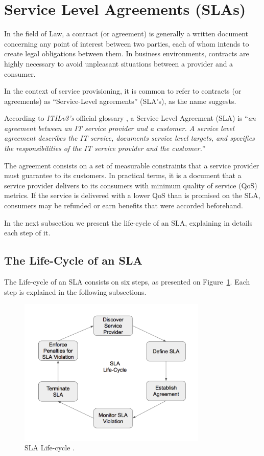 \section{Service Level Agreements (SLAs)}

In the field of Law, a contract (or agreement) is generally a written document concerning any point of interest between two parties, each of whom intends to create legal obligations between them. In business environments, contracts are highly necessary to avoid unpleasant situations between a provider and a consumer. 

In the context of service provisioning, it is common to refer to contracts (or agreements) as ``Service-Level agreements'' (SLA's), as the name suggests.  

According to \textit{ITILv3's} official glossary \cite{itilv3glossary}, a Service Level Agreement (SLA) is ``\textit{an agreement between an IT service provider and a customer. 
A service level agreement describes the IT service, documents service level targets, and specifies the responsibilities of the IT service provider and the customer.}'' 

The agreement consists on a set of measurable constraints that a service provider must guarantee to its customers.
In practical terms, it is a document that a service provider delivers to its consumers with minimum quality of service (QoS) metrics. 
If the service is delivered with a lower QoS than is promised on the SLA, consumers may be refunded or earn benefits that were accorded beforehand. 

In the next subsection we present the life-cycle of an SLA, explaining in details each step of it. 

\subsection{The Life-Cycle of an SLA}

The Life-cycle of an SLA consists on six steps, as presented on Figure~\ref{fig:sla-lifecycle}. Each step is explained in the following subsections. 

\begin{figure}[ht!]
\centering
\includegraphics[width=90mm]{Imagens/sla-lifecycle.png}
\caption{SLA Life-cycle \cite{wu2012service}.\label{fig:sla-lifecycle}}
\end{figure}


